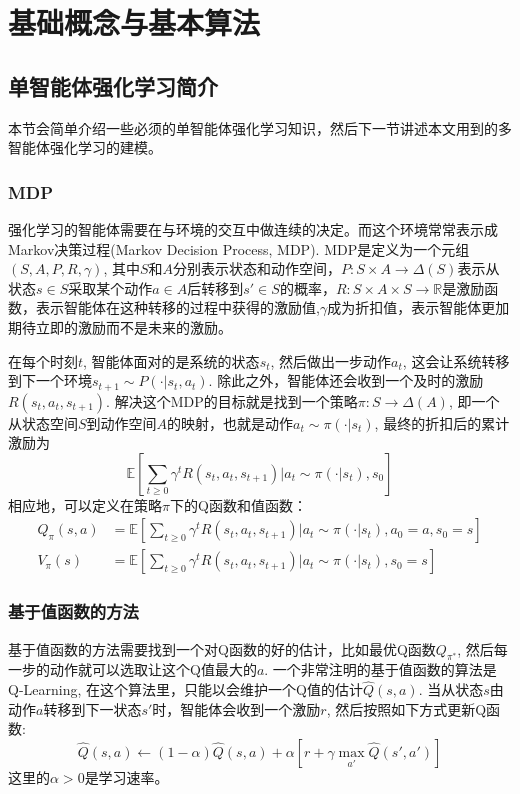 
\chapter{基础概念与基本算法}
\section{单智能体强化学习简介}
本节会简单介绍一些必须的单智能体强化学习知识，然后下一节讲述本文用到的多智能体强化学习的建模。

\subsection{MDP}
强化学习的智能体需要在与环境的交互中做连续的决定。而这个环境常常表示成Markov决策过程(Markov Decision Process, MDP). MDP是定义为一个元组$(S,A,P,R,\gamma)$, 其中$S$和$A$分别表示状态和动作空间，$P:S\times A\to \Delta (S)$表示从状态$s\in S$采取某个动作$a\in A$后转移到$s'\in S$的概率，$R: S\times A\times S\to \mathbb{R}$是激励函数，表示智能体在这种转移的过程中获得的激励值,$\gamma$成为折扣值，表示智能体更加期待立即的激励而不是未来的激励。

在每个时刻$t$, 智能体面对的是系统的状态$s_t$, 然后做出一步动作$a_t$, 这会让系统转移到下一个环境$s_{t+1}\sim P(\cdot|s_t,a_t)$. 除此之外，智能体还会收到一个及时的激励$R(s_t,a_t,s_{t+1})$. 解决这个MDP的目标就是找到一个策略$\pi:S\to \Delta(A)$, 即一个从状态空间$S$到动作空间$A$的映射，也就是动作$a_t\sim \pi(\cdot|s_t)$, 最终的折扣后的累计激励为
\begin{equation}
    \mathbb{E}\left[\sum_{t\ge 0}\gamma^t R(s_t,a_t,s_{t+1})\bigg|a_t\sim\pi(\cdot|s_t),s_0    \right]
\end{equation}
相应地，可以定义在策略$\pi$下的Q函数和值函数：
\begin{align}
Q_\pi(s,a) &= \mathbb{E}\left[\sum_{t\ge 0}\gamma^t R(s_t,a_t,s_{t+1})\bigg|a_t\sim\pi(\cdot|s_t),a_0=a,s_0 =s\right] \\
V_\pi(s) &= \mathbb{E}\left[\sum_{t\ge 0}\gamma^t R(s_t,a_t,s_{t+1})\bigg|a_t\sim\pi(\cdot|s_t),s_0 =s\right]
\end{align}

\subsection{基于值函数的方法}
基于值函数的方法需要找到一个对Q函数的好的估计，比如最优Q函数$Q_{\pi^*}$, 然后每一步的动作就可以选取让这个Q值最大的$a$. 一个非常注明的基于值函数的算法是Q-Learning, 在这个算法里，只能以会维护一个Q值的估计$\hat{Q}(s,a)$. 当从状态$s$由动作$a$转移到下一状态$s'$时，智能体会收到一个激励$r$, 然后按照如下方式更新Q函数:
\begin{equation}
    \hat{Q}(s,a)\leftarrow (1-\alpha)\hat{Q}(s,a) + \alpha \left[ r + \gamma \max_{a'}\hat{Q}(s',a') \right]
\end{equation}
这里的$\alpha>0$是学习速率。

